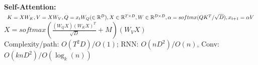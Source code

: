 \textbf{Self-Attention:} $K=XW_K, V=XW_V, Q=x_{t}W_Q (\in \mathbb{R}^{D}),\\ 
X\in \mathbb{R}^{T\times D}, W\in \mathbb{R}^{D\times D}, \alpha = softmx(QK^T/\sqrt{D}), x_{t+1} = \alpha V$\\
$X = softmax(\frac{(W_QX)(W_KX)^T}{\sqrt{D}} + M) (W_VX)$\\
Complexity/path: $O(T^2D)/ O(1)$; RNN: $O(nD^2)/O(n)$, Conv: $O(knD^2)/ O(\log_k(n))$\\ 

